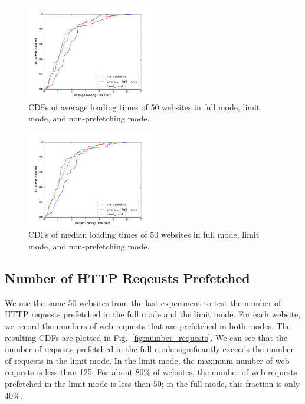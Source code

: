 \begin{figure}[htbp] 
	\centering
	\includegraphics[width=0.5\textwidth]{average.png}  
	\caption{CDFs of average loading times of 50 websites in full mode, limit mode, and non-prefetching mode.}
	\label{fig:average}
\end{figure} 

\begin{figure}[htbp] 
	\centering
	\includegraphics[width=0.5\textwidth]{median.png}  
	\caption{CDFs of median loading times of 50 websites in full mode, limit mode, and non-prefetching mode.}
	\label{fig:median}
\end{figure} 

\subsection{Number of HTTP Reqeusts Prefetched}


We use the same 50 websites from the last experiment to test the number of HTTP requests prefetched in the full mode and the limit mode. For each website, we record the numbers of web requests that are prefetched in both modes. The resulting CDFs are plotted in Fig.~\ref{fig:number_requests}. We can see that the number of requests prefetched in the full mode significantly exceeds the number of requests in the limit mode. In the limit mode, the maximum number of web requests is less than 125. For about 80\% of websites, the number of web requests prefetched in the limit mode is less than 50; in the full mode, this fraction is only 40\%.


